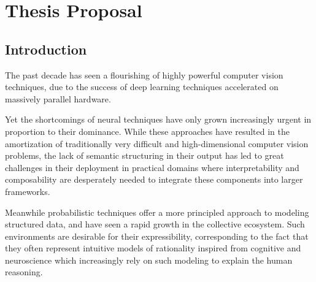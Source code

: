 
\chapter{Thesis Proposal}

\section{Introduction}

  The past decade has seen a flourishing of highly powerful computer vision
  techniques, due to the success of deep learning techniques accelerated on
  massively parallel hardware.

  Yet the shortcomings of neural techniques have only grown increasingly urgent
  in proportion to their dominance. While these approaches have resulted in the
  amortization of traditionally very difficult and high-dimensional computer
  vision problems, the lack of semantic structuring in their output has led to
  great challenges in their deployment in practical domains where
  interpretability and composability are desperately needed to integrate these
  components into larger frameworks.

  Meanwhile probabilistic techniques offer a more principled approach to
  modeling structured data, and have seen a rapid growth in the collective
  ecosystem. Such environments are desirable for their expressibility,
  corresponding to the fact that they often represent intuitive models of
  rationality inspired from cognitive and neuroscience which increasingly rely
  on such modeling to explain the human reasoning.

